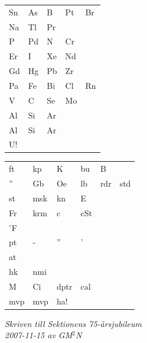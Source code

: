 \documentclass[a6paper,10pt]{article}
\begin{document}
\begin{center}
\end{center}
\vspace{-10pt}
\begin{table}[!h]
\begin{tabularx}{0.8\textwidth}{X X X X X}
 Sn&As&B&Pt&Br
\vspace{2pt} \\
 Na & Tl & Pr 
\vspace{2pt} \\
  P & Pd & N & Cr
\vspace{2pt} \\
Er & I & Xe & Nd
\vspace{2pt} \\
Gd&Hg&Pb&Zr
\vspace{2pt} \\
Pa&Fe&Bi&Cl&Rn
\vspace{2pt} \\
V&C&Se&Mo
\vspace{2pt} \\
Al &Si&Ar
\vspace{2pt} \\
Al &Si&Ar
\vspace{2pt} \\
U!
\end{tabularx}
\end{table}
\vspace{-10pt}
\begin{center}
\end{center}
\vspace{-10pt}
\begin{table}[!h]
\begin{tabularx}{0.8\textwidth}{X X X X X X}
 ft&kp&K&bu&B
\vspace{2pt} \\
 '' &Gb & Oe & lb&rdr&std 
\vspace{2pt} \\
st&msk&kn&E
\vspace{2pt} \\
Fr&krm&c&cSt
\vspace{2pt} \\
$^{\circ}$F
\vspace{2pt} \\
pt&-&''&'
\vspace{2pt} \\
at
\vspace{2pt} \\
hk&nmi \\
M&Ci&dptr&cal
\vspace{2pt} \\
mvp & mvp & ha!
\end{tabularx}
\end{table}
\vspace{-10pt}
\begin{flushright}
\textit{Skriven till Sektionens 75-årsjubileum\\ 2007-11-15 av GM$^2$N}
\end{flushright}
\end{document}
